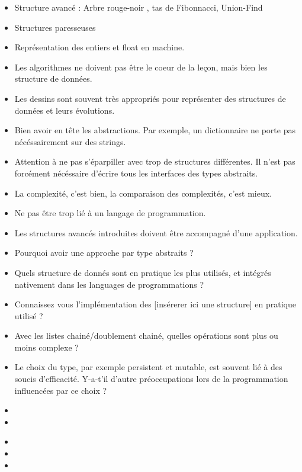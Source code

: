 \documentclass{agregfiche}
\begin{document}
\begin{itemize}
	\item Structure avancé : Arbre rouge-noir , tas de Fibonnacci, Union-Find
	\item Structures paresseuses
	\item Représentation des entiers et float en machine.
\end{itemize}

\secpieges

\begin{itemize}
	\item Les algorithmes ne doivent pas être le coeur de la leçon, mais bien les structure de données.
	\item Les dessins sont souvent très appropriés pour représenter des structures de données et leurs évolutions.
	\item Bien avoir en tête les abstractions. Par exemple, un dictionnaire ne porte pas nécéssairement sur des strings.
	\item Attention à ne pas s'éparpiller avec trop de structures différentes. Il n'est pas forcément nécéssaire d'écrire tous les interfaces des types abstraits.
	\item La complexité, c'est bien, la comparaison des complexités, c'est mieux.
	\item Ne pas être trop lié à un langage de programmation.
	\item Les structures avancés introduites doivent être accompagné d'une application.
\end{itemize}

\secquestionsclassiques

\begin{itemize}
	\item Pourquoi avoir une approche par type abstraits ?
	\item Quels structure de donnés sont en pratique les plus utilisés, et intégrés nativement dans les languages de programmations ?
	\item Connaissez vous l'implémentation des [insérerer ici une structure] en pratique utilisé ?
	\item Avec les listes chainé/doublement chainé, quelles opérations sont plus ou moins complexe ?
	\item Le choix du type, par exemple persistent et mutable, est souvent lié à des soucis d'efficacité. Y-a-t'il d'autre préoccupations lors de la programmation influencées par ce choix ?
\end{itemize}

\secreferences

\begin{itemize}
\item 
\item 
\end{itemize}

\secdev

\begin{itemize}
\item 
\item 
\item 
\end{itemize}
\end{document}
